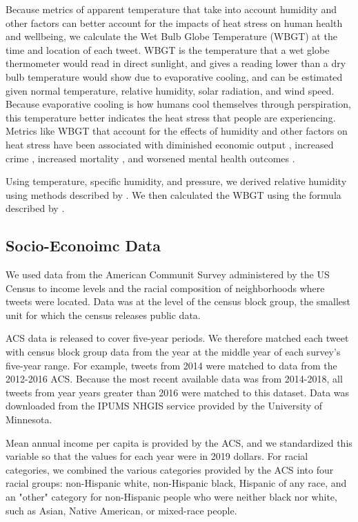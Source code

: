 \documentclass{article}
\begin{document}
Because metrics of apparent temperature that take into account humidity and other factors can better account for the impacts of heat stress on human health and wellbeing, we calculate the Wet Bulb Globe Temperature (WBGT) at the time and location of each tweet.  WBGT is the temperature that a wet globe thermometer would read in direct sunlight, and gives a reading lower than a dry bulb temperature would show due to evaporative cooling, and can be estimated given normal temperature, relative humidity, solar radiation, and wind speed.  Because evaporative cooling is how humans cool themselves through perspiration, this temperature better indicates the heat stress that people are experiencing.  Metrics like WBGT that account for the effects of humidity and other factors on heat stress have been associated with diminished economic output \cite{rao2020projections}, increased crime \cite{hu2017impact}, increased mortality \cite{chien2016spatiotemporal, armstrong2019role}, and worsened mental health outcomes \cite{vida2012relationship, ding2016importance}.

Using temperature, specific humidity, and pressure, we derived relative humidity using methods described by  \cite{bolton_computation_1980}.  We then calculated the WBGT using the formula described by \cite{heo2019comparison}.

\subsection{Socio-Econoimc Data}
We used data from the American Communit   Survey administered by the US Census to income levels and the racial composition of neighborhoods where tweets were located.  Data was at the level of the census block group, the smallest unit for which the census releases public data.

ACS data is released to cover five-year periods.  We therefore matched each tweet with census block group data from the year at the middle year of each survey's five-year range.  For example, tweets from 2014 were matched to data from the 2012-2016 ACS.  Because the most recent available data was from 2014-2018, all tweets from year years greater than 2016 were matched to this dataset.  Data was downloaded from the IPUMS NHGIS service provided by the University of Minnesota.

Mean annual income per capita is provided by the ACS, and we standardized this variable so that the values for each year were in 2019 dollars.  For racial categories, we combined the various categories provided by the ACS into four racial groups: non-Hispanic white, non-Hispanic black, Hispanic of any race, and an "other" category for non-Hispanic people who were neither black nor white, such as Asian, Native American, or mixed-race people.
\end{document}
